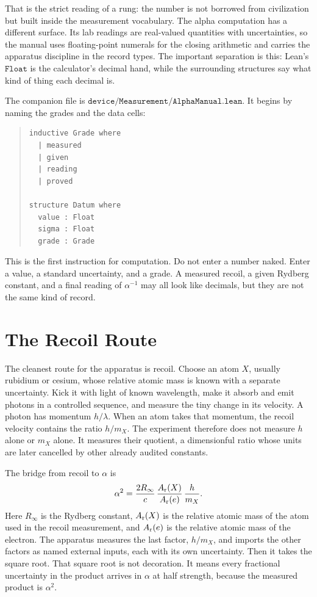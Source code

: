 That is the strict reading of a rung: the number is not borrowed from civilization but built inside the
measurement vocabulary. The alpha computation has a different surface. Its lab readings are real-valued
quantities with uncertainties, so the manual uses floating-point numerals for the closing arithmetic and carries
the apparatus discipline in the record types. The important separation is this: Lean's \(\texttt{Float}\) is the
calculator's decimal hand, while the surrounding structures say what kind of thing each decimal is.

The companion file is \(\texttt{device/Measurement/AlphaManual.lean}\). It begins by naming the grades and the
data cells:

\begin{quote}\small
\begin{verbatim}
inductive Grade where
  | measured
  | given
  | reading
  | proved

structure Datum where
  value : Float
  sigma : Float
  grade : Grade
\end{verbatim}
\end{quote}

This is the first instruction for computation. Do not enter a number naked. Enter a value, a standard
uncertainty, and a grade. A measured recoil, a given Rydberg constant, and a final reading of
\(\alpha^{-1}\) may all look like decimals, but they are not the same kind of record.

\section{The Recoil Route}

The cleanest route for the apparatus is recoil. Choose an atom \(X\), usually rubidium or cesium, whose relative
atomic mass is known with a separate uncertainty. Kick it with light of known wavelength, make it absorb and emit
photons in a controlled sequence, and measure the tiny change in its velocity. A photon has momentum \(h/\lambda\).
When an atom takes that momentum, the recoil velocity contains the ratio \(h/m_X\). The experiment therefore does
not measure \(h\) alone or \(m_X\) alone. It measures their quotient, a dimensionful ratio whose units are later
cancelled by other already audited constants.

The bridge from recoil to \(\alpha\) is
\[
  \alpha^2 =
  \frac{2R_\infty}{c}\,
  \frac{A_{\rm r}(X)}{A_{\rm r}(e)}\,
  \frac{h}{m_X}.
\]
Here \(R_\infty\) is the Rydberg constant, \(A_{\rm r}(X)\) is the relative atomic mass of the atom used in the
recoil measurement, and \(A_{\rm r}(e)\) is the relative atomic mass of the electron. The apparatus measures the
last factor, \(h/m_X\), and imports the other factors as named external inputs, each with its own uncertainty.
Then it takes the square root. That square root is not decoration. It means every fractional uncertainty in the
product arrives in \(\alpha\) at half strength, because the measured product is \(\alpha^2\).

